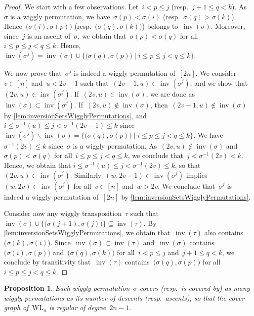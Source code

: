\documentclass{amsart}
\newtheorem{proposition}[theorem]{Proposition}
\theoremstyle{definition}
\newcommand{\bigset}[2]{\big\{ #1 \;\big|\; #2 \big\}} %
\newcommand{\ssm}{\smallsetminus} %
\DeclareMathOperator{\inv}{inv} %
\newcommand{\wigglyLattice}{\mathrm{WL}} %
\begin{document}
\begin{proof}
We start with a few observations.
Let~$i < p \le j$ (resp.~$j+1 \le q < k$).
As~$\sigma$ is a wiggly permutation, we have~$\sigma(p) < \sigma(i)$ (resp.~$\sigma(q) > \sigma(k)$).
Hence~$\big( \sigma(i), \sigma(p) \big)$ (resp.~$\big( \sigma(q), \sigma(k) \big)$) belongs to~$\inv(\sigma)$.
Moreover, since~$j$ is an ascent of~$\sigma$, we obtain that~$\sigma(p) < \sigma(q)$ for all~${i \le p \le j < q \le k}$.
Hence, $\inv(\sigma^j) = \inv(\sigma) \cup \bigset{ \big( \sigma(q), \sigma(p) \big) }{i \le p \le j < q \le k}$.

We now prove that~$\sigma^j$ is indeed a wiggly permutation of~$[2n]$.
We consider~$v \in [n]$ and~$u < 2v-1$ such that~$(2v-1, u) \in \inv(\sigma^j)$, and we show that~$(2v, u) \in \inv(\sigma^j)$.
If~$(2v, u) \in \inv(\sigma)$, we are done as~$\inv(\sigma) \subset \inv(\sigma^j)$.
If~$(2v, u) \not\in \inv(\sigma)$, then~$(2v-1, u) \not\in \inv(\sigma)$ by \cref{lem:inversionSetsWigglyPermutations}, and~$i \le \sigma^{-1}(u) \le j < \sigma^{-1}(2v-1) \le k$ since~${\inv(\sigma^j) \ssm \inv(\sigma) = \bigset{ \big( \sigma(q), \sigma(p) \big) }{i \le p \le j < q \le k}}$.
We have~$\sigma^{-1}(2v) \le k$ since~$\sigma$ is a wiggly permutation.
As~$(2v, u) \not\in \inv(\sigma)$ and~$\sigma(p) < \sigma(q)$ for all~$i \le p \le j < q \le k$, we conclude that~$j < \sigma^{-1}(2v) < k$.
Hence, we obtain that ${i \le \sigma^{-1}(u) \le j < \sigma^{-1}(2v) \le k}$, so that~$(2v,u) \in \inv(\sigma^j)$.
Similarly~${(w, 2v-1) \in \inv(\sigma^j)}$ implies~$(w, 2v) \in \inv(\sigma^j)$ for all~$v \in [n]$ and~$w > 2v$.
We conclude that~$\sigma^j$ is indeed a wiggly permutation of~$[2n]$ by \cref{lem:inversionSetsWigglyPermutations}.

Consider now any wiggly transposition~$\tau$ such that~$\inv(\sigma) \cup \big\{ \big( \sigma(j+1), \sigma(j) \big) \big\} \subseteq \inv(\tau)$.
By \cref{lem:inversionSetsWigglyPermutations}, we obtain that~$\inv(\tau)$ also contains %
$\big( \sigma(k), \sigma(i) \big)$.
Since~$\inv(\sigma) \subset \inv(\tau)$ and~$\inv(\sigma)$ contains~$\big( \sigma(i), \sigma(p) \big)$ and~$\big( \sigma(q), \sigma(k) \big)$ for all~$i < p \le j$ and~$j+1 \le q < k$, we conclude by transitivity that~$\inv(\tau)$ contains~$\big( \sigma(q), \sigma(p) \big)$ for all~$i \le p \le j < q \le k$.
\end{proof}

\begin{proposition}
Each wiggly permutation~$\sigma$ covers (resp.~is covered by) as many wiggly permutations as its number of descents (resp.~ascents), so that the cover graph of~$\wigglyLattice_n$ is regular of degree~$2n-1$.
\end{proposition}
\end{document}
